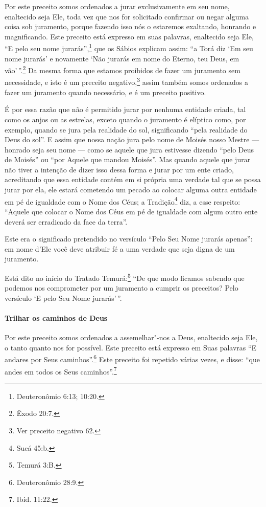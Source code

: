 \begin{multicols}{2}
Por este preceito somos ordenados a jurar exclusivamente em seu nome,
enaltecido seja Ele, toda vez que nos for solicitado confirmar ou negar
alguma coisa sob juramento, porque fazendo isso nós o estaremos
exaltando, honrando e magnificando. Este preceito está expresso em suas
palavras, enaltecido seja Ele, ``E pelo seu nome jurarás'',\footnote{Deuteronômio 6:13; 10:20.} que os Sábios explicam assim: ``a Torá\starr{} diz
`Em seu nome jurarás' e novamente `Não jurarás em nome do Eterno, teu
Deus, em vão'\,''.\footnote{Êxodo 20:7.} Da mesma forma que estamos proibidos de
fazer um juramento sem necessidade, e isto é um preceito
negativo,\footnote{Ver preceito negativo 62.} assim também somos ordenados a fazer um juramento quando necessário, e é um preceito positivo.

É por essa razão que não é permitido jurar por nenhuma entidade criada,
tal como os anjos ou as estrelas, exceto quando o juramento é elíptico
como, por exemplo, quando se jura pela realidade do sol, significando
``pela realidade do Deus do sol''. E assim que nossa nação jura pelo
nome de Moisés nosso Mestre --- honrado seja seu nome --- como se aquele
que jura estivesse dizendo ``pelo Deus de Moisés'' ou ``por Aquele que
mandou Moisés''. Mas quando aquele que jurar não tiver a intenção de
dizer isso dessa forma e jurar por um ente criado, acreditando que essa
entidade contém em si própria uma verdade tal que se possa jurar por
ela, ele estará cometendo um pecado ao colocar alguma outra entidade em
pé de igualdade com o Nome dos Céus; a Tradição\footnote{Sucá\starr{} 45:b.}
diz, a esse respeito: ``Aquele que colocar o Nome dos Céus em pé de
igualdade com algum outro ente deverá ser erradicado da face da terra''.

Este era o significado pretendido no versículo ``Pelo Seu Nome jurarás
apenas'': em nome d'Ele você deve atribuir fé a uma verdade que seja
digna de um juramento.

Está dito no início do Tratado Temurá\starr:\footnote{Temurá\starr{} 3:B.} ``De que
modo ficamos sabendo que podemos nos comprometer por um juramento a cumprir os preceitos? Pelo versículo `E pelo Seu Nome jurarás'\,''.

\paragraph{Trilhar os caminhos de Deus}

Por este preceito somos ordenados a assemelhar"-nos a Deus, enaltecido
seja Ele, o tanto quanto nos for possível. Este preceito está expresso
em Suas palavras ``E andares por Seus caminhos''.\footnote{Deuteronômio 28:9.}
Este preceito foi repetido várias vezes, e disse: ``que andes em todos os Seus
caminhos''.\footnote{Ibid. 11:22.}


\end{multicols}

